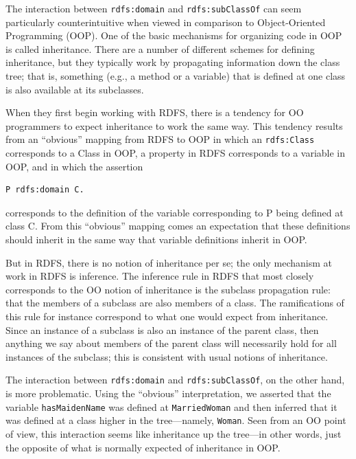 \begin{sidebar}{}
The interaction between \texttt{rdfs:domain} and \texttt{rdfs:subClassOf} can seem
particularly counterintuitive when viewed in comparison to
Object-Oriented Programming (OOP). One of the basic mechanisms for
organizing code in OOP is called inheritance. There are a number of
different schemes for defining inheritance, but they typically work by
propagating information down the class tree; that is, something (e.g., a
method or a variable) that is defined at one class is also available at
its subclasses.

When they first begin working with RDFS, there is a tendency for OO
programmers to expect inheritance to work the same way. This tendency
results from an ``obvious'' mapping from RDFS to OOP in which an
\texttt{rdfs:Class} corresponds to a Class in OOP, a property in RDFS corresponds
to a variable in OOP, and in which the assertion

\begin{lstlisting}
P rdfs:domain C.
\end{lstlisting}

corresponds to the definition of the variable corresponding to P being
defined at class C. From this ``obvious'' mapping comes an expectation
that these definitions should inherit in the same way that variable
definitions inherit in OOP.

But in RDFS, there is no notion of inheritance per se; the only
mechanism at work in RDFS is inference. The inference rule in RDFS that
most closely corresponds to the OO notion of inheritance is the subclass
propagation rule: that the members of a subclass are also members of a
class. The ramifications of this rule for instance correspond to what
one would expect from inheritance. Since an instance of a subclass is
also an instance of the parent class, then anything we say about members
of the parent class will necessarily hold for all instances of the
subclass; this is consistent with usual notions of inheritance.

The interaction between \texttt{rdfs:domain} and \texttt{rdfs:subClassOf}, on the other
hand, is more problematic. Using the ``obvious'' interpretation, we
asserted that the variable \texttt{hasMaidenName} was defined at \texttt{MarriedWoman} and
then inferred that it was defined at a class higher in the
tree---namely, \texttt{Woman}. Seen from an OO point of view, this interaction
seems like inheritance up the tree---in other words, just the opposite
of what is normally expected of inheritance in OOP.


\end{sidebar}
